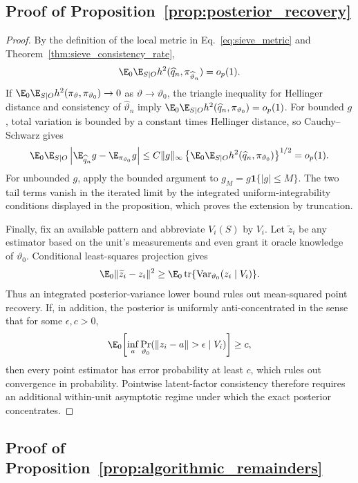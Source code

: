 \subsection{Proof of Proposition~\ref{prop:posterior_recovery}}

\begin{proof}
By the definition of the local metric in Eq.~\eqref{eq:sieve_metric} and
Theorem~\ref{thm:sieve_consistency_rate},
\[
 \E_0\E_{S\mid O}h^2(\widehat q_n,
 \pi_{\widehat\vartheta_n})=o_p(1).
\]
If $\E_0\E_{S\mid O}h^2(\pi_\vartheta,\pi_{\vartheta_0})\to0$ as
$\vartheta\to\vartheta_0$, the triangle inequality for Hellinger distance and
consistency of $\widehat\vartheta_n$ imply
$\E_0\E_{S\mid O}h^2(\widehat q_n,\pi_{\vartheta_0})=o_p(1)$.
For bounded $g$, total variation is bounded by a constant times Hellinger
distance, so Cauchy--Schwarz gives
\[
 \E_0\E_{S\mid O}\left|
 \E_{\widehat q_n}g-\E_{\pi_{\vartheta_0}}g\right|
 \le C\|g\|_\infty
 \left\{\E_0\E_{S\mid O}
 h^2(\widehat q_n,\pi_{\vartheta_0})\right\}^{1/2}=o_p(1).
\]
For unbounded $g$, apply the bounded argument to
$g_M=g\mathbf 1\{|g|\le M\}$.  The two tail terms vanish in the iterated
limit by the integrated uniform-integrability conditions displayed in the
proposition, which proves the extension by truncation.

Finally, fix an available pattern and abbreviate $V_i(S)$ by $V_i$.  Let
$\widetilde z_i$ be any estimator based on the unit's
measurements and even grant it oracle knowledge of $\vartheta_0$.  Conditional
least-squares projection gives
\[
 \E_0\|\widetilde z_i-z_i\|^2
 \ge \E_0\operatorname{tr}\{
 \operatorname{Var}_{\vartheta_0}(z_i\mid V_i)\}.
\]
Thus an integrated posterior-variance lower bound rules out mean-squared
point recovery.  If, in addition, the posterior is uniformly
anti-concentrated in the sense that for some $\epsilon,c>0$,
\[
 \E_0\!\left[\inf_a
 \Pr_{\vartheta_0}(\|z_i-a\|>\epsilon\mid V_i)\right]\ge c,
\]
then every point estimator has error probability at least $c$, which rules
out convergence in probability.  Pointwise latent-factor consistency
therefore requires an additional within-unit asymptotic regime under which
the exact posterior concentrates.
\end{proof}

\subsection{Proof of Proposition~\ref{prop:algorithmic_remainders}}

